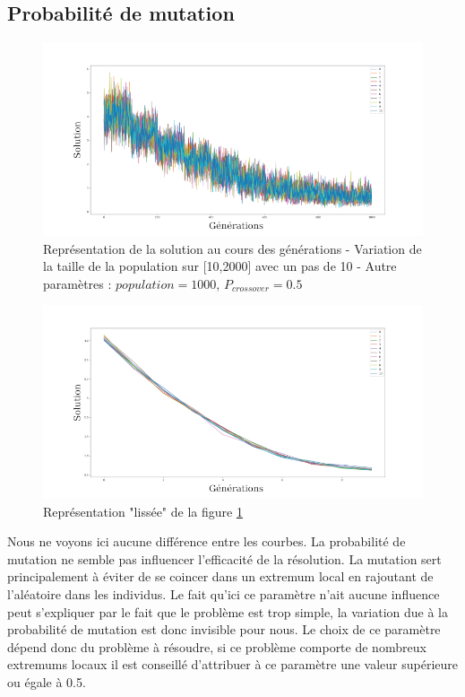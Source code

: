 \documentclass[12pt]{report}
\begin{document}
      \subsection{Probabilité de mutation}

      \begin{figure}[h]
        \centering
        \includegraphics[width=17cm]{img/evo_mutation_brut.png}
        \caption{Représentation de la solution au cours des générations - Variation de la taille de la population sur [10,2000] avec un pas de 10 - Autre paramètres : $population = 1000$, $P_{crossover} = 0.5$}
        \label{evo_mutation_brut}
      \end{figure}

      \begin{figure}[!]
        \centering
        \includegraphics[width=17cm]{img/evo_mutation_moy.png}
        \caption{Représentation "lissée" de la figure \ref{evo_mutation_brut}}
        \label{evo_mutation_moy}
      \end{figure}

      Nous ne voyons ici aucune différence entre les courbes. La probabilité de mutation ne semble pas influencer l'efficacité de la résolution. La mutation sert principalement à éviter de se coincer dans un extremum local en rajoutant de l'aléatoire dans les individus. Le fait qu'ici ce paramètre n'ait aucune influence peut s'expliquer par le fait que le problème est trop simple, la variation due à la probabilité de mutation est donc invisible pour nous. Le choix de ce paramètre dépend donc du problème à résoudre, si ce problème comporte de nombreux extremums locaux il est conseillé d'attribuer à ce paramètre une valeur supérieure ou égale à 0.5.
\end{document}
